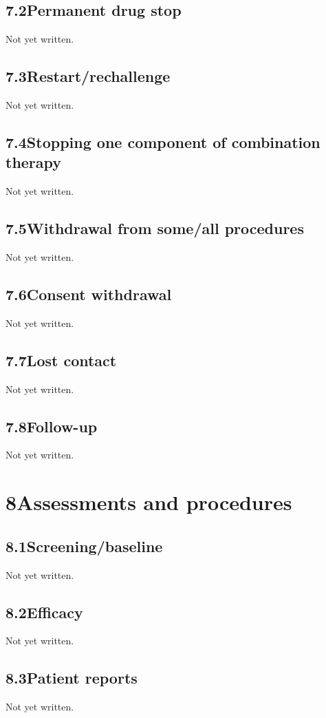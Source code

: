 \documentclass[11pt,a4paper]{article}
\newcommand{\psnote}[2]{\par\noindent\colorbox{#1!8}{\parbox{\dimexpr\linewidth-2\fboxsep}{\small\color{#1}#2}}\par}
\begin{document}
\subsection{7.2\quad Permanent drug stop}\label{section.7.2}
\psnote{pswarn}{Not yet written.}
\subsection{7.3\quad Restart/rechallenge}\label{section.7.3}
\psnote{pswarn}{Not yet written.}
\subsection{7.4\quad Stopping one component of combination therapy}\label{section.7.4}
\psnote{pswarn}{Not yet written.}
\subsection{7.5\quad Withdrawal from some/all procedures}\label{section.7.5}
\psnote{pswarn}{Not yet written.}
\subsection{7.6\quad Consent withdrawal}\label{section.7.6}
\psnote{pswarn}{Not yet written.}
\subsection{7.7\quad Lost contact}\label{section.7.7}
\psnote{pswarn}{Not yet written.}
\subsection{7.8\quad Follow-up}\label{section.7.8}
\psnote{pswarn}{Not yet written.}
\section{8\quad Assessments and procedures}\label{section.8}
\subsection{8.1\quad Screening/baseline}\label{section.8.1}
\psnote{pswarn}{Not yet written.}
\subsection{8.2\quad Efficacy}\label{section.8.2}
\psnote{pswarn}{Not yet written.}
\subsection{8.3\quad Patient reports}\label{section.8.3}
\psnote{pswarn}{Not yet written.}
\end{document}
